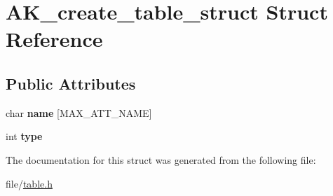 \hypertarget{structAK__create__table__struct}{}\section{A\+K\+\_\+create\+\_\+table\+\_\+struct Struct Reference}
\label{structAK__create__table__struct}
\subsection*{Public Attributes}
\begin{DoxyCompactItemize}
\item 
char {\bfseries name} \mbox{[}M\+A\+X\+\_\+\+A\+T\+T\+\_\+\+N\+A\+ME\mbox{]}\hypertarget{structAK__create__table__struct_a22326c60182d352e7970c404a4771181}{}\label{structAK__create__table__struct_a22326c60182d352e7970c404a4771181}

\item 
int {\bfseries type}\hypertarget{structAK__create__table__struct_aa252469c3f2dbd3585f6a14b862b72f7}{}\label{structAK__create__table__struct_aa252469c3f2dbd3585f6a14b862b72f7}

\end{DoxyCompactItemize}


The documentation for this struct was generated from the following file\+:\begin{DoxyCompactItemize}
\item 
file/\hyperlink{table_8h}{table.\+h}\end{DoxyCompactItemize}
